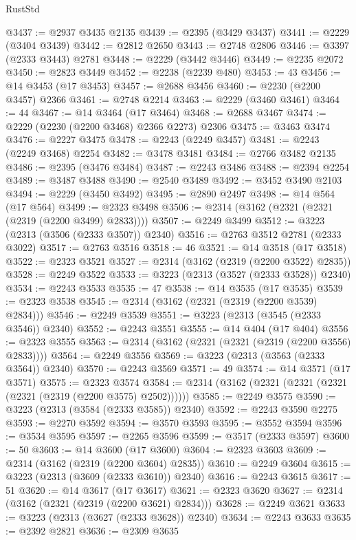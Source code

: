 \begin{lexlean}{RustStd}
\begin{coremodule}
@3437 := @2937 @3435 @2135
@3439 := @2395 (@3429 @3437)
@3441 := @2229 (@3404 @3439)
@3442 := @2812 @2650
@3443 := @2748 @2806
@3446 := @3397 (@2333 @3443) @2781
@3448 := @2229 (@3442 @3446)
@3449 := @2235 @2072
@3450 := @2823 @3449
@3452 := @2238 (@2239 @480)
@3453 := 43
@3456 := @14 @3453 (@17 @3453)
@3457 := @2688 @3456
@3460 := @2230 (@2200 @3457) @2366
@3461 := @2748 @2214
@3463 := @2229 (@3460 @3461)
@3464 := 44
@3467 := @14 @3464 (@17 @3464)
@3468 := @2688 @3467
@3474 := @2229 (@2230 (@2200 @3468) @2366 @2273) @2306
@3475 := @3463 @3474
@3476 := @2227 @3475
@3478 := @2243 (@2249 @3457)
@3481 := @2243 (@2249 @3468) @2254
@3482 := @3478 @3481
@3484 := @2766 @3482 @2135
@3486 := @2395 (@3476 @3484)
@3487 := @2243 @3486
@3488 := @2394 @2254
@3489 := @3487 @3488
@3490 := @2540 @3489
@3492 := @3452 @3490 @2103
@3494 := @2229 (@3450 @3492)
@3495 := @2890 @2497
@3498 := @14 @564 (@17 @564)
@3499 := @2323 @3498
@3506 := @2314 (@3162 (@2321 (@2321 (@2319 (@2200 @3499) @2833))))
@3507 := @2249 @3499
@3512 := @3223 (@2313 (@3506 (@2333 @3507)) @2340)
@3516 := @2763 @3512 @2781 (@2333 @3022)
@3517 := @2763 @3516
@3518 := 46
@3521 := @14 @3518 (@17 @3518)
@3522 := @2323 @3521
@3527 := @2314 (@3162 (@2319 (@2200 @3522) @2835))
@3528 := @2249 @3522
@3533 := @3223 (@2313 (@3527 (@2333 @3528)) @2340)
@3534 := @2243 @3533
@3535 := 47
@3538 := @14 @3535 (@17 @3535)
@3539 := @2323 @3538
@3545 := @2314 (@3162 (@2321 (@2319 (@2200 @3539) @2834)))
@3546 := @2249 @3539
@3551 := @3223 (@2313 (@3545 (@2333 @3546)) @2340)
@3552 := @2243 @3551
@3555 := @14 @404 (@17 @404)
@3556 := @2323 @3555
@3563 := @2314 (@3162 (@2321 (@2321 (@2319 (@2200 @3556) @2833))))
@3564 := @2249 @3556
@3569 := @3223 (@2313 (@3563 (@2333 @3564)) @2340)
@3570 := @2243 @3569
@3571 := 49
@3574 := @14 @3571 (@17 @3571)
@3575 := @2323 @3574
@3584 := @2314 (@3162 (@2321 (@2321 (@2321 (@2321 (@2319 (@2200 @3575) @2502))))))
@3585 := @2249 @3575
@3590 := @3223 (@2313 (@3584 (@2333 @3585)) @2340)
@3592 := @2243 @3590 @2275
@3593 := @2270 @3592
@3594 := @3570 @3593
@3595 := @3552 @3594
@3596 := @3534 @3595
@3597 := @2265 @3596
@3599 := @3517 (@2333 @3597)
@3600 := 50
@3603 := @14 @3600 (@17 @3600)
@3604 := @2323 @3603
@3609 := @2314 (@3162 (@2319 (@2200 @3604) @2835))
@3610 := @2249 @3604
@3615 := @3223 (@2313 (@3609 (@2333 @3610)) @2340)
@3616 := @2243 @3615
@3617 := 51
@3620 := @14 @3617 (@17 @3617)
@3621 := @2323 @3620
@3627 := @2314 (@3162 (@2321 (@2319 (@2200 @3621) @2834)))
@3628 := @2249 @3621
@3633 := @3223 (@2313 (@3627 (@2333 @3628)) @2340)
@3634 := @2243 @3633
@3635 := @2392 @2821
@3636 := @2309 @3635

\end{coremodule}
\end{lexlean}
